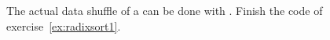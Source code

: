   \label{ex:radixsort2}
  The actual data shuffle of a  can be done
  with . Finish the code of
  exercise~\ref{ex:radixsort1}.
